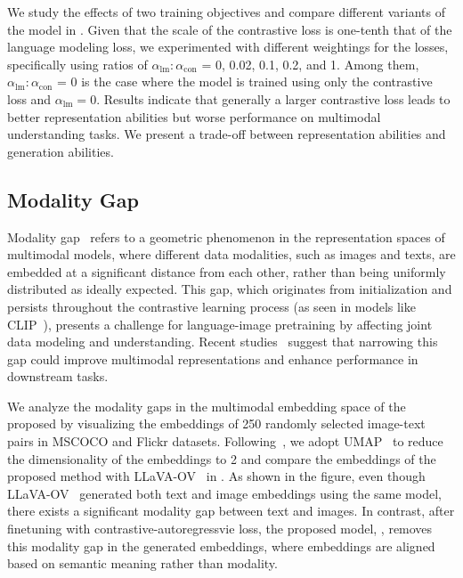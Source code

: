 
We study the effects of two training objectives and compare different variants of the model in . Given that the scale of the contrastive loss is one-tenth that of the language modeling loss, we experimented with different weightings for the losses, specifically using ratios of  $\alpha_{\text{lm}}:\alpha_{\text{con}}$ = 0, 0.02, 0.1, 0.2, and 1. Among them, $\alpha_{\text{lm}}:\alpha_{\text{con}}$ = 0 is the case where the model is trained using only the contrastive loss and $\alpha_{\text{lm}} = 0$. Results indicate that generally a larger contrastive loss leads to better representation abilities but worse performance on multimodal understanding tasks. We present a trade-off between representation abilities and generation abilities.  

\subsection{Modality Gap}

Modality gap~\citep{liang2022mind} refers to a geometric phenomenon in the representation spaces of multimodal models, where different data modalities, such as images and texts, are embedded at a significant distance from each other, rather than being uniformly distributed as ideally expected. 
This gap, which originates from initialization and persists throughout the contrastive learning process (as seen in models like CLIP~\citep{radford2021learning}), presents a challenge for language-image pretraining by affecting joint data modeling and understanding. Recent studies~\citep{srivastava2024omnivec,oh2024geodesic} suggest that narrowing this gap could improve multimodal representations and enhance performance in downstream tasks. 

We analyze the modality gaps in the multimodal embedding space of the proposed \algname by visualizing the embeddings of 250 randomly selected image-text pairs in MSCOCO and Flickr datasets. Following~\citep{liang2022mind}, we adopt UMAP~\citep{mcinnes2018umap} to reduce the dimensionality of the embeddings to 2 and  
compare the embeddings of the proposed method with LLaVA-OV~\citep{li2024llava} in .
As shown in the figure, even though LLaVA-OV~\citep{li2024llava} generated both text and image embeddings using the same model, there exists a significant modality gap between text and images. 
In contrast, after finetuning with contrastive-autoregressvie loss, the proposed model, \algname, removes this modality gap in the generated embeddings, where embeddings are aligned based on semantic meaning rather than modality.
%